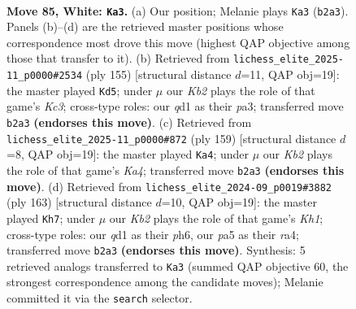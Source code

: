 \documentclass[11pt]{article}
\begin{document}
\clearpage

\begin{figure}[p]\centering
\begin{subfigure}{0.46\textwidth}\centering
\resizebox{\linewidth}{!}{%
\newchessgame
\chessboard[
  setfen={8/8/1p6/p7/2Pk4/8/1K6/3q4 w - - 26 85},
  showmover=false,
  pgfstyle=straightmove, color=movearrow, markmove={b2-a3}
]}
\caption{}
\end{subfigure}\hfill
\begin{subfigure}{0.46\textwidth}\centering
\resizebox{\linewidth}{!}{%
\newchessgame
\chessboard[
  setfen={8/8/2k5/8/pK4p1/P5P1/8/8 b - - 5 78},
  showmover=false,
  pgfstyle=straightmove, color=movearrow, markmove={c6-d5}
]}
\caption{}
\end{subfigure}
\\[4pt]
\begin{subfigure}{0.46\textwidth}\centering
\resizebox{\linewidth}{!}{%
\newchessgame
\chessboard[
  setfen={1Q6/8/4K3/k2p2p1/3P4/6P1/8/8 b - - 4 80},
  showmover=false,
  pgfstyle=straightmove, color=movearrow, markmove={a5-a4}
]}
\caption{}
\end{subfigure}\hfill
\begin{subfigure}{0.46\textwidth}\centering
\resizebox{\linewidth}{!}{%
\newchessgame
\chessboard[
  setfen={7k/8/4Kp1P/5P2/R7/8/8/8 b - - 2 82},
  showmover=false,
  pgfstyle=straightmove, color=movearrow, markmove={h8-h7}
]}
\caption{}
\end{subfigure}
\caption{\textbf{Move 85, White: \texttt{Ka3}.} (a) Our position; Melanie plays \texttt{Ka3} (\texttt{b2a3}). Panels (b)--(d) are the retrieved master positions whose correspondence most drove this move (highest QAP objective among those that transfer to it). (b) Retrieved from \texttt{lichess\_elite\_2025-11\_p0000\#2534} (ply 155) [structural distance $d$=11, QAP obj=19]: the master played \texttt{Kd5}; under $\mu$ our \emph{Kb2} plays the role of that game's \emph{Kc3}; cross-type roles: our \emph{q}d1 as their \emph{p}a3; transferred move \texttt{b2a3} \textbf{(endorses this move)}. (c) Retrieved from \texttt{lichess\_elite\_2025-11\_p0000\#872} (ply 159) [structural distance $d$=8, QAP obj=19]: the master played \texttt{Ka4}; under $\mu$ our \emph{Kb2} plays the role of that game's \emph{Ka4}; transferred move \texttt{b2a3} \textbf{(endorses this move)}. (d) Retrieved from \texttt{lichess\_elite\_2024-09\_p0019\#3882} (ply 163) [structural distance $d$=10, QAP obj=19]: the master played \texttt{Kh7}; under $\mu$ our \emph{Kb2} plays the role of that game's \emph{Kh1}; cross-type roles: our \emph{q}d1 as their \emph{p}h6, our \emph{p}a5 as their \emph{r}a4; transferred move \texttt{b2a3} \textbf{(endorses this move)}. Synthesis: 5 retrieved analogs transferred to \texttt{Ka3} (summed QAP objective 60, the strongest correspondence among the candidate moves); Melanie committed it via the \texttt{search} selector.}
\label{fig:thought-m168}
\end{figure}
\end{document}
